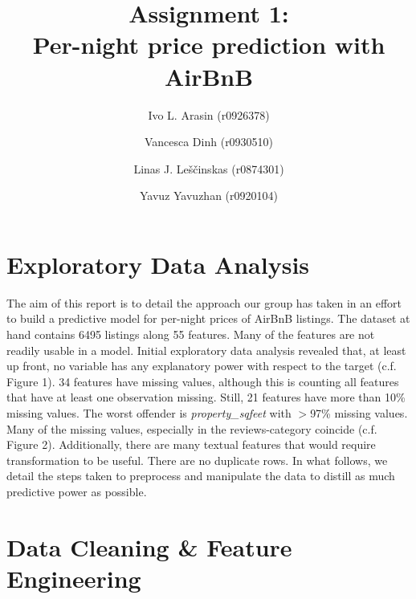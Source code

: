 \documentclass[11pt, oneside]{article}   	%
\title{Assignment 1: \\ Per-night price prediction with AirBnB}
\author{\centering Ivo L. Arasin (r0926378) \and Vancesca Dinh (r0930510) \and Linas J. Leščinskas (r0874301) \and Yavuz Yavuzhan (r0920104)}
\begin{document}
\maketitle
\section{Exploratory Data Analysis}
\indent The aim of this report is to detail the approach our group has taken in an effort to build a predictive model for per-night prices of AirBnB listings. The dataset at hand contains 6495 listings along 55 features. Many of the features are not readily usable in a model. Initial exploratory data analysis revealed that, at least up front, no variable has any explanatory power with respect to the target (c.f. Figure 1). 34 features have missing values, although this is counting all features that have at least one observation missing. Still, 21 features have more than 10\% missing values. The worst offender is \textit{property\_sqfeet} with $>$97\% missing values. Many of the missing values, especially in the reviews-category coincide (c.f. Figure 2). Additionally, there are many textual features that would require transformation to be useful. There are no duplicate rows. \newline
\indent In what follows, we detail the steps taken to preprocess and manipulate the data to distill as much predictive power as possible. 
\section{Data Cleaning \& Feature Engineering}
\end{document}
